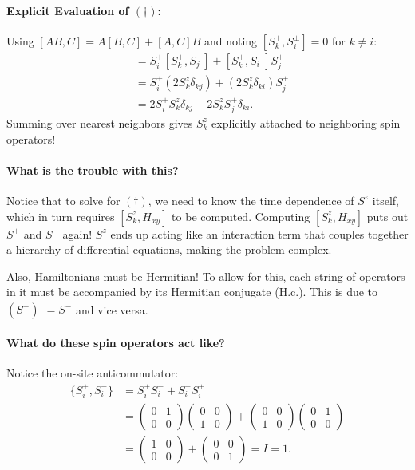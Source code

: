 \documentclass[11pt,a4paper]{article}
\begin{document}
\paragraph{Explicit Evaluation of $(\dagger)$:}
Using $[AB, C] = A[B,C] + [A,C]B$ and noting $[S_k^+, S_i^\pm] = 0$ for $k \neq i$:
\begin{align}
    [S_k^+, S_i^+ S_j^- + S_i^- S_j^+] &= S_i^+ [S_k^+, S_j^-] + [S_k^+, S_i^-] S_j^+ \nonumber \\
    &= S_i^+ (2 S_k^z \delta_{kj}) + (2 S_k^z \delta_{ki}) S_j^+ \nonumber \\
    &= 2 S_i^+ S_k^z \delta_{kj} + 2 S_k^z S_j^+ \delta_{ki}.
\end{align}
Summing over nearest neighbors gives $S_k^z$ explicitly attached to neighboring spin operators!

\paragraph{What is the trouble with this?}
Notice that to solve for $(\dagger)$, we need to know the time dependence of $S^z$ itself, which in turn requires $[S_k^z, H_{xy}]$ to be computed. Computing $[S_k^z, H_{xy}]$ puts out $S^+$ and $S^-$ again! $S^z$ ends up acting like an interaction term that couples together a hierarchy of differential equations, making the problem complex.

Also, Hamiltonians must be Hermitian! To allow for this, each string of operators in it must be accompanied by its Hermitian conjugate (H.c.). This is due to $(S^+)^\dagger = S^-$ and vice versa.

\paragraph{What do these spin operators act like?}
Notice the on-site anticommutator:
\begin{align}
    \{S_i^+, S_i^-\} &= S_i^+ S_i^- + S_i^- S_i^+ \nonumber \\
    &= \begin{pmatrix} 0 & 1 \\ 0 & 0 \end{pmatrix} \begin{pmatrix} 0 & 0 \\ 1 & 0 \end{pmatrix} + \begin{pmatrix} 0 & 0 \\ 1 & 0 \end{pmatrix} \begin{pmatrix} 0 & 1 \\ 0 & 0 \end{pmatrix} \nonumber \\
    &= \begin{pmatrix} 1 & 0 \\ 0 & 0 \end{pmatrix} + \begin{pmatrix} 0 & 0 \\ 0 & 1 \end{pmatrix} = I = 1.
\end{align}
\end{document}
